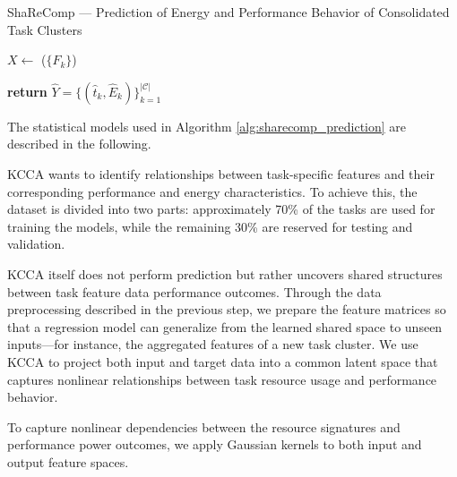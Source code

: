 \begin{algorithm}[H]
    \caption{ShaReComp — Prediction of Energy and Performance Behavior of Consolidated Task Clusters}
    \label{alg:sharecomp_prediction}


    \BlankLine
    $X \gets$ \Build($\{F_k\}$) 

    \BlankLine
    \BlankLine
    \textbf{return } $\hat{Y} = \{ (\hat{t}_k, \hat{E}_k) \}_{k=1}^{|\mathcal{C}|}$
\end{algorithm}

The statistical models used in Algorithm \ref{alg:sharecomp_prediction} are described in the following.

\label{sec:KCCA}

KCCA wants to identify relationships between task-specific features and their corresponding performance and energy characteristics. To achieve this, the dataset is divided into two parts: approximately 70\% of the tasks are used for training the models, while the remaining 30\% are reserved for testing and validation.

KCCA itself does not perform prediction but rather uncovers shared structures between task feature data performance outcomes. Through the data preprocessing described in the previous step, we prepare the feature matrices so that a regression model can generalize from the learned shared space to unseen inputs—for instance, the aggregated features of a new task cluster. We use KCCA to project both input and target data into a common latent space that captures nonlinear relationships between task resource usage and performance behavior.

To capture nonlinear dependencies between the resource signatures
and performance power outcomes, we apply Gaussian kernels to both
input and output feature spaces.

